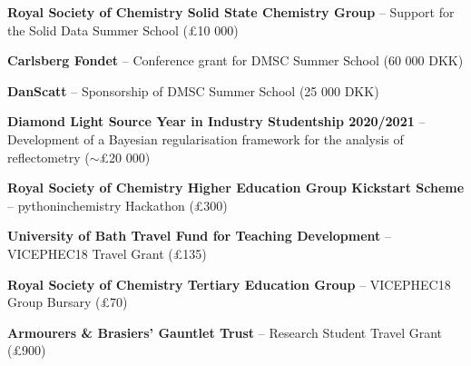 \begin{cventriesy}
  \cventryy
    {
      \begin{cvitems}
        \item {\textbf{Royal Society of Chemistry Solid State Chemistry Group} -- Support for the Solid Data Summer School (£10 000)}
        \vspace{1mm}
        \item {\textbf{Carlsberg Fondet} -- Conference grant for DMSC Summer School (60 000 DKK)}
        \vspace{1mm}
        \item {\textbf{DanScatt} -- Sponsorship of DMSC Summer School (25 000 DKK)}
        \vspace{1mm}
        \item {\textbf{Diamond Light Source Year in Industry Studentship 2020/2021} -- Development of a Bayesian regularisation framework for the analysis of reflectometry ($\sim$£20 000)}
        \vspace{1mm}
        \item {\textbf{Royal Society of Chemistry Higher Education Group Kickstart Scheme} -- pythoninchemistry Hackathon (£300)}
        \vspace{1mm}
        \item {\textbf{University of Bath Travel Fund for Teaching Development} -- VICEPHEC18 Travel Grant (£135)}
        \vspace{1mm}
        \item {\textbf{Royal Society of Chemistry Tertiary Education Group} -- VICEPHEC18 Group Bursary (£70)}
        \vspace{1mm}
        \item {\textbf{Armourers \& Brasiers’ Gauntlet Trust} -- Research Student Travel Grant (£900)}
      \end{cvitems}
    }
\end{cventriesy}
